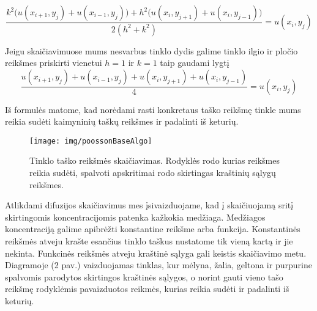 \documentclass{VUMIFPSkursinis}
\begin{document}
\begin{equation}
\frac{k^2 \Big(u(x_{ i + 1} , y_j) + u(x_{ i - 1} , y_j)\Big) + h^2\Big(u(x_{ i } , y_{ j + 1}) + u(x_{ i } , y_{j - 1})\Big)}{2 (h^2 + k^2)} = u(x_{ i } , y_j)
\end{equation}


Jeigu skaičiavimuose mums nesvarbus tinklo dydis galime tinklo ilgio ir pločio reikšmes priskirti vienetui $h=1$ ir $k=1$ taip gaudami lygtį
\begin{equation}
\frac{u(x_{ i + 1} , y_j) + u(x_{ i - 1} , y_j) + u(x_{ i } , y_{ j + 1}) + u(x_{ i } , y_{j - 1})}{4} = u(x_{ i } , y_j)
\end{equation}

Iš formulės matome, kad norėdami rasti konkretaus taško reikšmę tinkle mums reikia sudėti kaimyninių taškų reikšmes ir padalinti iš keturių.

\begin{figure}[H]
\centering
\texttt{[image: img/poossonBaseAlgo]}
\caption{Tinklo taško reikšmės skaičiavimas. Rodyklės rodo kurias reikšmes reikia sudėti, spalvoti apskritimai rodo skirtingas kraštinių sąlygų reikšmes.} %
\label{img:text}
\end{figure}
Atlikdami difuzijos skaičiavimus mes įsivaizduojame, kad į skaičiuojamą sritį skirtingomis koncentracijomis patenka kažkokia medžiaga.
Medžiagos koncentraciją galime apibrėžti konstantine reikšme arba funkcija.
Konstantinės reikšmės atveju krašte esančius tinklo taškus nustatome tik vieną kartą ir jie nekinta.
Funkcinės reikšmės atveju kraštinė sąlyga gali keistis skaičiavimo metu.
Diagramoje (2 pav.) vaizduojamas tinklas, kur mėlyna, žalia, geltona ir purpurine spalvomis parodytos skirtingos kraštinės sąlygos, o norint gauti vieno tašo reikšmę rodyklėmis pavaizduotos reikmės, kurias reikia sudėti ir padalinti iš keturių.
\end{document}

